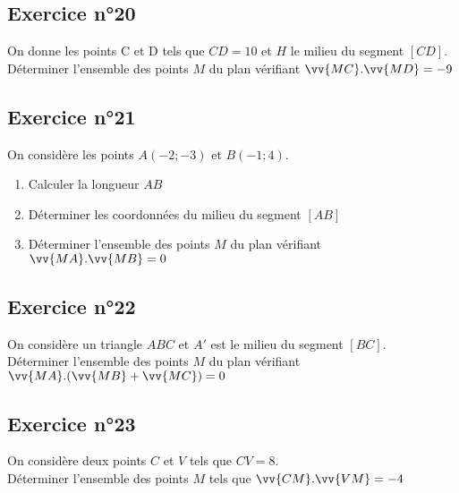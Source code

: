 \documentclass[12pt,a4paper]{article}
\begin{document}
\subsection*{Exercice n°20} 

On donne les points C et D tels que $CD=10$ et $H$ le milieu du segment $[CD]$.\\
Déterminer l'ensemble des points $M$ du plan vérifiant $\vv{MC}.\vv{MD}=-9$

\subsection*{Exercice n°21} 

On considère les points $A(-2;-3)$ et $B(-1;4)$.\\

\begin{enumerate}
    \item Calculer la longueur $AB$
    \item Déterminer les coordonnées du milieu du segment $[AB]$
    \item Déterminer l'ensemble des points $M$ du plan vérifiant $\vv{MA}.\vv{MB}=0$
\end{enumerate}

\subsection*{Exercice n°22} 

On considère un triangle $ABC$ et $A'$ est le milieu du segment $[BC]$.\\
Déterminer l'ensemble des points $M$ du plan vérifiant $\vv{MA}.(\vv{MB}+\vv{MC})=0$

\subsection*{Exercice n°23} 

On considère deux points $C$ et $V$ tels que $CV=8$.\\
Déterminer l'ensemble des points $M$ tels que $\vv{CM}.\vv{VM}=-4$
\end{document}
